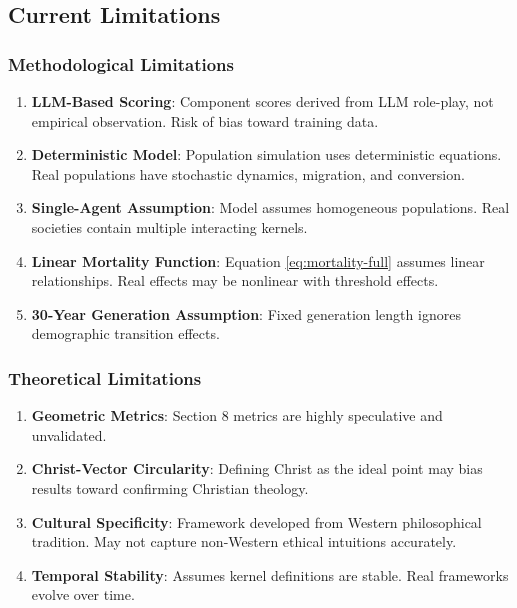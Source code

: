 \documentclass[11pt,a4paper]{article}
\theoremstyle{definition}
\theoremstyle{remark}
\begin{document}
\subsection{Current Limitations}

\subsubsection{Methodological Limitations}

\begin{enumerate}
    \item \textbf{LLM-Based Scoring}: Component scores derived from LLM role-play, not empirical observation. Risk of bias toward training data.
    
    \item \textbf{Deterministic Model}: Population simulation uses deterministic equations. Real populations have stochastic dynamics, migration, and conversion.
    
    \item \textbf{Single-Agent Assumption}: Model assumes homogeneous populations. Real societies contain multiple interacting kernels.
    
    \item \textbf{Linear Mortality Function}: Equation \ref{eq:mortality-full} assumes linear relationships. Real effects may be nonlinear with threshold effects.
    
    \item \textbf{30-Year Generation Assumption}: Fixed generation length ignores demographic transition effects.
\end{enumerate}

\subsubsection{Theoretical Limitations}

\begin{enumerate}
    \item \textbf{Geometric Metrics}: Section 8 metrics are highly speculative and unvalidated.
    
    \item \textbf{Christ-Vector Circularity}: Defining Christ as the ideal point may bias results toward confirming Christian theology.
    
    \item \textbf{Cultural Specificity}: Framework developed from Western philosophical tradition. May not capture non-Western ethical intuitions accurately.
    
    \item \textbf{Temporal Stability}: Assumes kernel definitions are stable. Real frameworks evolve over time.
\end{enumerate}
\end{document}

